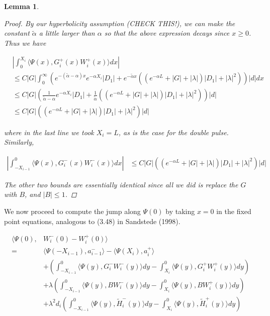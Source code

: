 \documentclass[12pt]{article}
\newtheorem{lemma}{Lemma}
\begin{document}
\begin{lemma}
\begin{proof}
By our hyperbolicity assumption (CHECK THIS!), we can make the constant $\tilde{\alpha}$ a little larger than $\alpha$ so that the above expression decays since $x \geq 0$. Thus we have

\begin{align*}
&\left| \int_0^{X_i} \langle \Psi(x), G_i^+(x) W_i^+(x) \rangle dx \right| \\
&\leq C|G| \int_0^{\infty} \left(  e^{-(\tilde{\alpha} - \alpha)x} e^{-\alpha X_i} |D_1| +  e^{-\tilde{\alpha} x} \left( (e^{-\alpha L} + |G| + |\lambda| ) |D_1| + |\lambda|^2 \right) \right) |d|dx \\
&\leq C|G| \left(  \frac{1}{\tilde{\alpha} - \alpha}e^{-\alpha X_i}|D_1| + \frac{1}{\tilde{\alpha}}\left( (e^{-\alpha L} + |G| + |\lambda| ) |D_1| + |\lambda|^2 \right) \right)|d| \\
&\leq C|G| \left( \left(e^{-\alpha L} + |G| + |\lambda|  \right) |D_1| + |\lambda|^2 \right)|d|
\end{align*}

where in the last line we took $X_i = L$, as is the case for the double pulse. Similarly,

\begin{align*}
\left| \int_{-X_{i-1}}^0 \langle \Psi(x), G_i^-(x) W_i^-(x) \rangle dx \right| &\leq C|G| \left( \left(e^{-\alpha L} + |G| + |\lambda|  \right) |D_1| + |\lambda|^2 \right)|d|
\end{align*}

The other two bounds are essentially identical since all we did is replace the $G$ with $B$, and $|B| \leq 1$.

\end{proof}
\end{lemma}

We now proceed to compute the jump along $\Psi(0)$ by taking $x = 0$ in the fixed point equations, analogous to (3.48) in Sandstede (1998).

\begin{align*}
\langle \Psi(0), &W_i^-(0) - W_i^+(0) \rangle \\
= &\langle \Psi(-X_{i-1}), a_{i-1}^-\rangle - \langle \Psi(X_i), a_{i}^+\rangle \\
&+\left( \int_{-X_{i-1}}^0 \langle \Psi(y), G_i^- W_i^-(y) \rangle dy - \int_{X_i}^0 \langle \Psi(y), G_i^+ W_i^+(y) \rangle dy \right) \\
&+ \lambda\left( \int_{-X_{i-1}}^0 \langle \Psi(y), B W_i^-(y) \rangle dy - \int_{X_i}^0 \langle \Psi(y), B W_i^+(y) \rangle dy \right) \\
&+\lambda^2 d_i \left( \int_{-X_{i-1}}^0 \langle \Psi(y), \tilde{H}_i^-(y) \rangle dy - \int_{X_i}^0 \langle \Psi(y), \tilde{H}_i^+(y) \rangle dy \right)
\end{align*}
\end{document}
